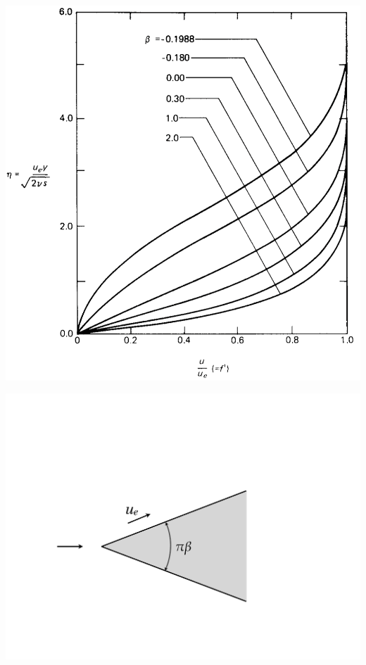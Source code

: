 \begin{center}
	\begin{minipage}{0.49\textwidth}
\begin{center}
	\includegraphics[scale=0.20]{ch5/13}
\end{center}
	\label{fig:5.13}
	\end{minipage}
	\begin{minipage}{0.49\textwidth}
\begin{center}
	\includegraphics[scale=0.34]{ch5/14}	
\end{center}
	\label{fig:5.14}
	\end{minipage}
	\end{center}
	
